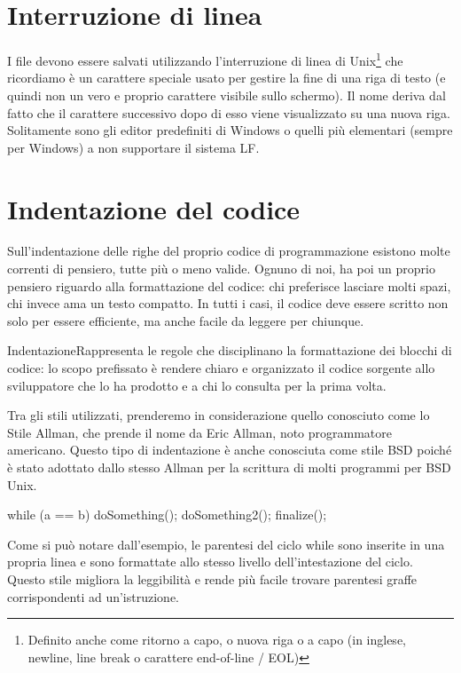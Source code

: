 \section*{Interruzione di linea}
I file devono essere salvati utilizzando l'interruzione di linea di Unix\footnote{Definito anche come ritorno a capo, o nuova riga o a capo (in inglese, newline, line break o carattere end-of-line / EOL)} che ricordiamo  è un carattere speciale usato per gestire la fine di una riga di testo (e quindi non un vero e proprio carattere visibile sullo schermo). Il nome deriva dal fatto che il carattere successivo dopo di esso viene visualizzato su una nuova riga.
Solitamente sono gli editor predefiniti di Windows o quelli più elementari (sempre per Windows) a non supportare il sistema LF.

\section*{Indentazione del codice}
Sull'indentazione delle righe del proprio codice di programmazione esistono molte correnti di pensiero, tutte più o meno valide. Ognuno di noi, ha poi un proprio pensiero riguardo alla formattazione del codice: chi preferisce lasciare molti spazi, chi invece ama un testo compatto. In tutti i casi, il codice deve essere scritto non solo per essere efficiente, ma anche facile da leggere per chiunque.

\begin{deftab}{Indentazione}{Rappresenta le regole che disciplinano la formattazione dei blocchi di codice: lo scopo prefissato è rendere chiaro e organizzato il codice sorgente allo sviluppatore che lo ha prodotto e a chi lo consulta per la prima volta.}
\end{deftab}

Tra gli stili utilizzati, prenderemo in considerazione quello conosciuto come lo Stile Allman, che prende il nome da Eric Allman, noto programmatore americano. Questo tipo di indentazione è anche conosciuta come stile BSD poiché è stato adottato dallo stesso Allman per la scrittura di molti programmi per BSD Unix.

\begin{code}
while (a == b)
  {
      doSomething();
      doSomething2();
  }
  finalize();
\end{code}

Come si può notare dall'esempio, le parentesi del ciclo while sono inserite in una propria linea e sono formattate allo stesso livello dell'intestazione del ciclo. Questo stile migliora la leggibilità e rende più facile trovare parentesi graffe corrispondenti ad un'istruzione.

